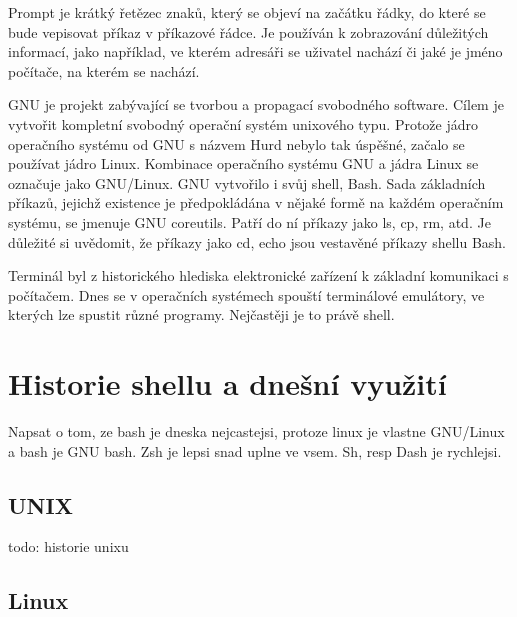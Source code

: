 \documentclass[thesis=M,czech]{FITthesis}[2012/06/26]
\begin{document}
Prompt je krátký řetězec znaků, který se objeví na začátku řádky, do které se bude vepisovat příkaz v příkazové řádce. Je používán k zobrazování důležitých informací, jako například, ve kterém adresáři se uživatel nachází či jaké je jméno počítače, na kterém se nachází.


GNU je projekt zabývající se tvorbou a propagací svobodného software. Cílem je vytvořit kompletní svobodný operační systém unixového typu. Protože jádro operačního systému od GNU s názvem Hurd nebylo tak úspěšné, začalo se používat jádro Linux. Kombinace operačního systému GNU a jádra Linux se označuje jako GNU/Linux. GNU vytvořilo i svůj shell, Bash. Sada základních příkazů, jejichž existence je předpokládána v nějaké formě na každém operačním systému, se jmenuje GNU coreutils. Patří do ní příkazy jako ls, cp, rm, atd. Je důležité si uvědomit, že příkazy jako cd, echo jsou vestavěné příkazy shellu Bash.


Terminál byl z historického hlediska elektronické zařízení k základní komunikaci s počítačem. Dnes se v operačních systémech spouští terminálové emulátory, ve kterých lze spustit různé programy. Nejčastěji je to právě shell.


\chapter{Historie shellu a dnešní využití}

Napsat o tom, ze bash je dneska nejcastejsi, protoze linux je vlastne GNU/Linux a bash je GNU bash. Zsh je lepsi snad uplne ve vsem. Sh, resp Dash je rychlejsi.

\section{UNIX}

todo: historie unixu

\section{Linux}


\end{document}
